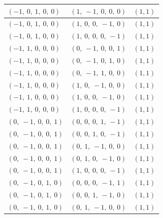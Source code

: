 \documentclass[11pt]{article}
\theoremstyle{definition}
\begin{document}
\begin{tabular}{|l|l|c|}
    \hline
    $\left( -1, \  0, \  1, \  0, \  0\right)$ & $\left( 1, \  -1, \  0, \  0, \  0\right)$ & $(1,1)$ \\
    \hline
    $\left( -1, \  0, \  1, \  0, \  0\right)$ & $\left( 1, \  0, \  0, \  -1, \  0\right)$ & $(1,1)$ \\
    \hline
    $\left( -1, \  0, \  1, \  0, \  0\right)$ & $\left( 1, \  0, \  0, \  0, \  -1\right)$ & $(1,1)$ \\
    \hline
    $\left( -1, \  1, \  0, \  0, \  0\right)$ & $\left( 0, \  -1, \  0, \  0, \  1\right)$ & $(1,1)$ \\
    \hline
    $\left( -1, \  1, \  0, \  0, \  0\right)$ & $\left( 0, \  -1, \  0, \  1, \  0\right)$ & $(1,1)$ \\
    \hline
    $\left( -1, \  1, \  0, \  0, \  0\right)$ & $\left( 0, \  -1, \  1, \  0, \  0\right)$ & $(1,1)$ \\
    \hline
    $\left( -1, \  1, \  0, \  0, \  0\right)$ & $\left( 1, \  0, \  -1, \  0, \  0\right)$ & $(1,1)$ \\
    \hline
    $\left( -1, \  1, \  0, \  0, \  0\right)$ & $\left( 1, \  0, \  0, \  -1, \  0\right)$ & $(1,1)$ \\
    \hline
    $\left( -1, \  1, \  0, \  0, \  0\right)$ & $\left( 1, \  0, \  0, \  0, \  -1\right)$ & $(1,1)$ \\
    \hline
    $\left( 0, \  -1, \  0, \  0, \  1\right)$ & $\left( 0, \  0, \  0, \  1, \  -1\right)$ & $(1,1)$ \\
    \hline
    $\left( 0, \  -1, \  0, \  0, \  1\right)$ & $\left( 0, \  0, \  1, \  0, \  -1\right)$ & $(1,1)$ \\
    \hline
    $\left( 0, \  -1, \  0, \  0, \  1\right)$ & $\left( 0, \  1, \  -1, \  0, \  0\right)$ & $(1,1)$ \\
    \hline
    $\left( 0, \  -1, \  0, \  0, \  1\right)$ & $\left( 0, \  1, \  0, \  -1, \  0\right)$ & $(1,1)$ \\
    \hline
    $\left( 0, \  -1, \  0, \  0, \  1\right)$ & $\left( 1, \  0, \  0, \  0, \  -1\right)$ & $(1,1)$ \\
    \hline
    $\left( 0, \  -1, \  0, \  1, \  0\right)$ & $\left( 0, \  0, \  0, \  -1, \  1\right)$ & $(1,1)$ \\
    \hline
    $\left( 0, \  -1, \  0, \  1, \  0\right)$ & $\left( 0, \  0, \  1, \  -1, \  0\right)$ & $(1,1)$ \\
    \hline
    $\left( 0, \  -1, \  0, \  1, \  0\right)$ & $\left( 0, \  1, \  -1, \  0, \  0\right)$ & $(1,1)$ \\

\end{tabular}
\end{document}
